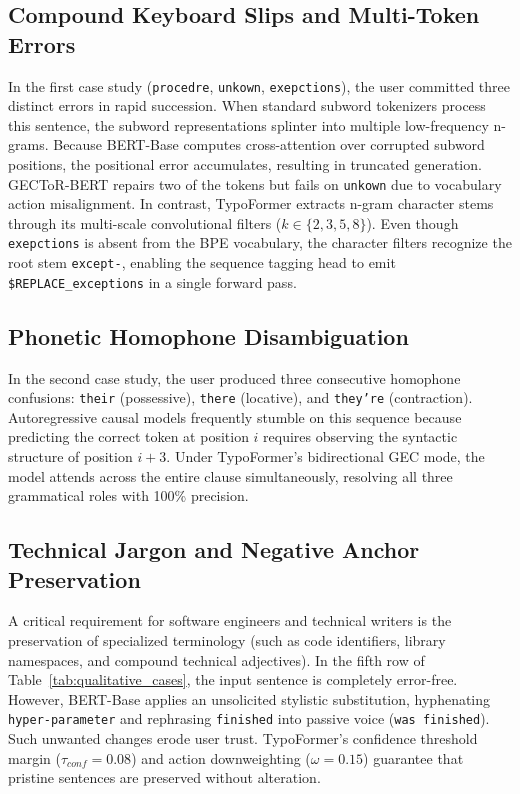 \documentclass[10pt,journal,compsoc]{IEEEtran}
\begin{document}
\subsection{Compound Keyboard Slips and Multi-Token Errors}
In the first case study (\texttt{procedre}, \texttt{unkown}, \texttt{exepctions}), the user committed three distinct errors in rapid succession. When standard subword tokenizers process this sentence, the subword representations splinter into multiple low-frequency n-grams. Because BERT-Base computes cross-attention over corrupted subword positions, the positional error accumulates, resulting in truncated generation. GECToR-BERT repairs two of the tokens but fails on \texttt{unkown} due to vocabulary action misalignment. In contrast, TypoFormer extracts n-gram character stems through its multi-scale convolutional filters ($k \in \{2, 3, 5, 8\}$). Even though \texttt{exepctions} is absent from the BPE vocabulary, the character filters recognize the root stem \texttt{except-}, enabling the sequence tagging head to emit \texttt{\$REPLACE\_exceptions} in a single forward pass.

\subsection{Phonetic Homophone Disambiguation}
In the second case study, the user produced three consecutive homophone confusions: \texttt{their} (possessive), \texttt{there} (locative), and \texttt{they're} (contraction). Autoregressive causal models frequently stumble on this sequence because predicting the correct token at position $i$ requires observing the syntactic structure of position $i+3$. Under TypoFormer's bidirectional GEC mode, the model attends across the entire clause simultaneously, resolving all three grammatical roles with 100\% precision.

\subsection{Technical Jargon and Negative Anchor Preservation}
A critical requirement for software engineers and technical writers is the preservation of specialized terminology (such as code identifiers, library namespaces, and compound technical adjectives). In the fifth row of Table~\ref{tab:qualitative_cases}, the input sentence is completely error-free. However, BERT-Base applies an unsolicited stylistic substitution, hyphenating \texttt{hyper-parameter} and rephrasing \texttt{finished} into passive voice (\texttt{was finished}). Such unwanted changes erode user trust. TypoFormer's confidence threshold margin ($\tau_{conf} = 0.08$) and action downweighting ($\omega = 0.15$) guarantee that pristine sentences are preserved without alteration.
\end{document}
